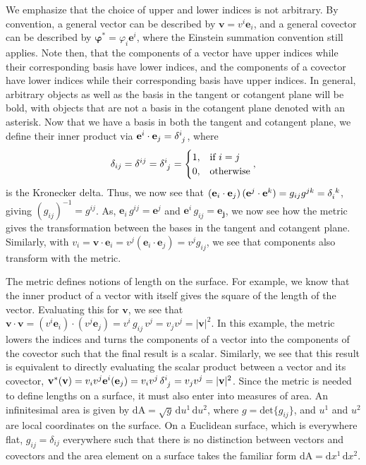 \begin{appendices}
We emphasize that the choice of upper and lower indices is not arbitrary.
By convention, a general vector can be described by $\mathbf{v} = v^{i}\mathbf{e}_i$, and a general covector can be described by $\bm{\varphi}^* = \varphi_{i}\mathbf{e}^i$, where the Einstein summation convention still applies.
Note then, that the components of a vector have upper indices while their corresponding basis have lower indices, and the components of a covector have lower indices while their corresponding basis have upper indices.
In general, arbitrary objects as well as the basis in the tangent or cotangent plane will be bold, with objects that are not a basis in the cotangent plane denoted with an asterisk.
Now that we have a basis in both the tangent and cotangent plane, we define their inner product via $\mathbf{e}^i \cdot \mathbf{e}_j = \tensor{\delta}{^i_j}$, where
\begin{equation}
  \delta_{ij} = \delta^{ij} = \tensor{\delta}{^i_j} = \begin{cases}
    1, & \textrm{if } i = j \\
    0, & \textrm{otherwise}
  \end{cases},
\end{equation}
is the Kronecker delta.
Thus, we now see that $(\mathbf{e}_i \cdot \mathbf{e}_j) \, (\mathbf{e}^j \cdot \mathbf{e}^k) = g_{ij}g^{jk} = \tensor{\delta}{_i^k}$, giving $(g_{ij})^{-1} = g^{ij}$.
As, $\mathbf{e}_i \, g^{ij} = \mathbf{e}^j$ and $\mathbf{e}^i \, g_{ij} = \mathbf{e_j}$, we now see how the metric gives the transformation between the bases in the tangent and cotangent plane.
Similarly, with $v_i = \mathbf{v}\cdot \mathbf{e}_i  = v^j(\mathbf{e}_i \cdot \mathbf{e}_j) = v^j g_{ij}$, we see that components also transform with the metric.

The metric defines notions of length on the surface.
For example, we know that the inner product of a vector with itself gives the square of the length of the vector.
Evaluating this for $\mathbf{v}$, we see that $\mathbf{v} \cdot \mathbf{v} = (v^i \mathbf{e}_i) \cdot (v^j \mathbf{e}_j) = v^i \, g_{ij} \, v^j = v_j v^j = |\mathbf{v}|^2$.
In this example, the metric lowers the indices and turns the components of a vector into the components of the covector such that the final result is a scalar.
Similarly, we see that this result is equivalent to directly evaluating the scalar product between a vector and its covector, $\mathbf{v}^* (\mathbf{v}) = v_i v^j \mathbf{e}^i (\mathbf{e}_j) = v_i v^j \, \tensor{\delta}{^i_j} = v_j v^j = |\mathbf{v}|^2$.
Since the metric is needed to define lengths on a surface, it must also enter into measures of area.
An infinitesimal area is given by $\textrm{dA} = \sqrt{g}\,\textrm{d}u^1 \, \textrm{d}u^2$, where $g = \textrm{det}\{ g_{ij} \}$, and $u^1$ and $u^2$ are local coordinates on the surface.
On a Euclidean surface, which is everywhere flat, $g_{ij} = \delta_{ij}$ everywhere such that there is no distinction between vectors and covectors and the area element on a surface takes the familiar form $\textrm{dA} = \textrm{d}x^1 \, \textrm{d}x^2$.


\end{appendices}

